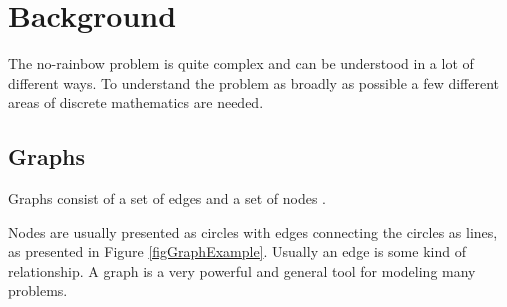 \documentclass[msc,lith,english]{liuthesis}
\begin{document}
\chapter{Background}
\label{chaBackground}
The no-rainbow problem is quite complex and can be understood in a lot of different ways.
To understand the problem as broadly as possible a few different areas of discrete mathematics are needed.

% 
% 
% 
% 
% 

\section{Graphs}
Graphs consist of a set of edges and a set of nodes
\cite[Section 9.1]{sourceArmen}.

Nodes are usually presented as circles with edges connecting the circles as lines, as presented in Figure \ref{figGraphExample}.
Usually an edge is some kind of relationship. 
A graph is a very powerful and general tool for modeling many problems.
\end{document}
